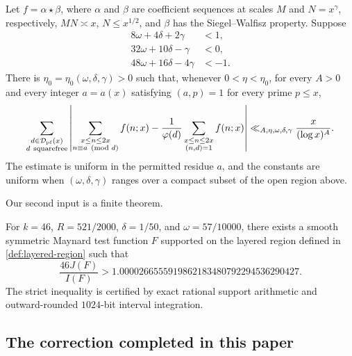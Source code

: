 \begin{theorem}
\label{thm:S52}
Let $f=\alpha\star\beta$, where $\alpha$ and $\beta$ are coefficient
sequences at scales $M$ and $N=x^\gamma$, respectively,
$MN\asymp x$, $N\le x^{1/2}$, and $\beta$ has the Siegel--Walfisz
property.  Suppose
\begin{align}
 8\omega+4\delta+2\gamma&<1,\label{eq:S52-a}\\
 32\omega+10\delta-\gamma&<0,\label{eq:S52-b}\\
 48\omega+16\delta-4\gamma&<-1.\label{eq:S52-c}
\end{align}
There is $\eta_0=\eta_0(\omega,\delta,\gamma)>0$ such that, whenever
$0<\eta<\eta_0$, for every $A>0$ and every integer $a=a(x)$ satisfying
$(a,p)=1$ for every prime $p\le x$,
\begin{equation}\label{eq:S52-conclusion}
 \sum_{\substack{d\in\mathcal D_{\mathrm{pf}}(x)\\d\ \mathrm{squarefree}}}
 \left|
 \sum_{\substack{x\le n\le2x\\n\equiv a\pmod d}}f(n;x)
 -\frac1{\varphi(d)}
 \sum_{\substack{x\le n\le2x\\(n,d)=1}}f(n;x)
 \right|
 \ll_{A,\eta,\omega,\delta,\gamma}
 \frac{x}{(\log x)^A}.
\end{equation}
The estimate is uniform in the permitted residue $a$, and the constants are
uniform when $(\omega,\delta,\gamma)$ ranges over a compact subset of the
open region above.
\end{theorem}

Our second input is a finite theorem.

\begin{theorem}\label{thm:finite-intro}
For $k=46$, $R=521/2000$, $\delta=1/50$, and
$\omega=57/10000$, there exists a smooth symmetric Maynard test function
$F$ supported on the layered region defined in \cref{def:layered-region}
such that
\begin{equation}\label{eq:finite-intro}
 \frac{46J(F)}{I(F)}>
 1.0000266555919862183480792294536290427.
\end{equation}
The strict inequality is certified by exact rational support arithmetic and
outward-rounded $1024$-bit interval integration.
\end{theorem}

\subsection{The correction completed in this paper}


